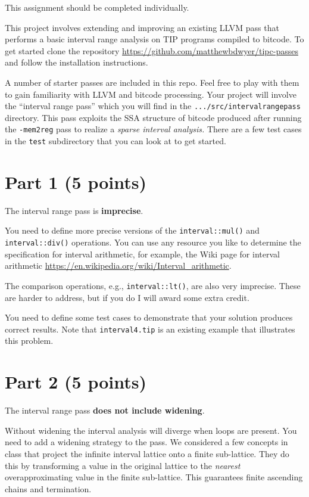 \documentclass[12pt,letterpaper]{article}
\begin{document}
This assignment should be completed individually.

This project involves extending and improving an existing LLVM pass that performs a basic interval range analysis on TIP programs compiled to bitcode.  To get started clone the repository \url{https://github.com/matthewbdwyer/tipc-passes} and follow the installation instructions. 

A number of starter passes are included in this repo.  Feel free to play with them to gain familiarity with LLVM and bitcode processing.  Your project will involve the ``interval range pass'' which you will find in the \texttt{.../src/intervalrangepass} directory.  This pass exploits the SSA structure of bitcode produced after running the \texttt{-mem2reg} pass to realize a \textit{sparse interval analysis.}  There are a few test cases in the \texttt{test} subdirectory that you can look at to get started.

\section*{Part 1 (5 points)}
The interval range pass is \textbf{imprecise}.  

You need to define more precise versions of the \texttt{interval::mul()} and \texttt{interval::div()} operations.  You can use any resource you like to determine the specification for interval arithmetic, for example, the Wiki page for interval arithmetic \url{https://en.wikipedia.org/wiki/Interval_arithmetic}.  

The comparison operations, e.g., \texttt{interval::lt()}, are also very imprecise.  These are harder to address, but if you do I will award some extra credit.

You need to define some test cases to demonstrate that your solution produces correct results.  Note that \texttt{interval4.tip} is an existing example that illustrates this problem.

\section*{Part 2 (5 points)}
The interval range pass \textbf{does not include widening}.

Without widening the interval analysis will diverge when loops are present.
You need to add a widening strategy to the pass.
We considered a few concepts in class that project the infinite interval lattice onto a finite sub-lattice.  They do this by transforming a value in the original lattice to the \textit{nearest} overapproximating value in the finite sub-lattice.  This guarantees finite ascending chains and termination.
\end{document}
